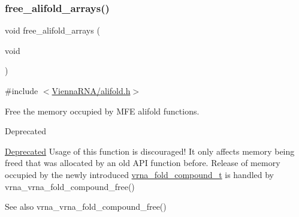 \subsubsection{\texorpdfstring{free\+\_\+alifold\+\_\+arrays()}{free\_alifold\_arrays()}}
{\footnotesize\ttfamily void free\+\_\+alifold\+\_\+arrays (\begin{DoxyParamCaption}\item[{void}]{ }\end{DoxyParamCaption})}



{\ttfamily \#include $<$\hyperlink{alifold_8h}{Vienna\+R\+N\+A/alifold.\+h}$>$}



Free the memory occupied by M\+FE alifold functions. 

\begin{DoxyRefDesc}{Deprecated}
\item[\hyperlink{deprecated__deprecated000014}{Deprecated}]Usage of this function is discouraged! It only affects memory being free\textquotesingle{}d that was allocated by an old A\+PI function before. Release of memory occupied by the newly introduced \hyperlink{group__fold__compound_ga1b0cef17fd40466cef5968eaeeff6166}{vrna\+\_\+fold\+\_\+compound\+\_\+t} is handled by vrna\+\_\+vrna\+\_\+fold\+\_\+compound\+\_\+free()\end{DoxyRefDesc}


\begin{DoxySeeAlso}{See also}
vrna\+\_\+vrna\+\_\+fold\+\_\+compound\+\_\+free() 
\end{DoxySeeAlso}
